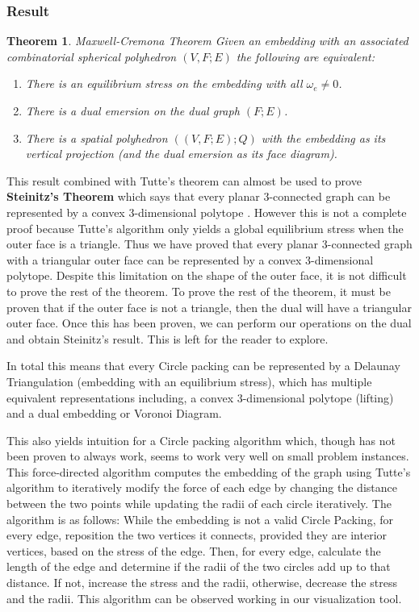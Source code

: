 \documentclass[11pt]{article}
\newtheorem{theorem}{Theorem}[section]
\theoremstyle{definition}
\begin{document}
\subsubsection{Result}

	\begin{theorem}{Maxwell-Cremona Theorem}
		Given an embedding with an associated combinatorial spherical polyhedron $(V,F;E)$ the following are equivalent:
			\begin{enumerate}
				\item There is an equilibrium stress on the embedding with all $\omega_e \neq 0$.
				\item There is a dual emersion on the dual graph $(F;E)$.
				\item There is a spatial polyhedron $((V,F;E);Q)$ with the embedding as its vertical projection (and the dual emersion as its face diagram).
 			\end{enumerate}
 	\end{theorem}
	
	This result combined with Tutte's theorem can almost be used to prove \textbf{Steinitz's Theorem} which says that every planar 3-connected graph can be represented by a convex 3-dimensional polytope \cite{realizationSpaces}. 
	However this is not a complete proof because Tutte's algorithm only yields a global equilibrium stress when the outer face is a triangle. 
	Thus we have proved that every planar 3-connected graph with a triangular outer face can be represented by a convex 3-dimensional polytope. 
	Despite this limitation on the shape of the outer face, it is not difficult to prove the rest of the theorem. 
	To prove the rest of the theorem, it must be proven that if the outer face is not a triangle, then the dual will have a triangular outer face. 
	Once this has been proven, we can perform our operations on the dual and obtain Steinitz's result. 
	This is left for the reader to explore.
 
 	In total this means that every Circle packing can be represented by a Delaunay Triangulation (embedding with an equilibrium stress), which has multiple equivalent representations including, a convex 3-dimensional polytope (lifting) and a dual embedding or Voronoi Diagram. 

	This also yields intuition for a Circle packing algorithm which, though has not been proven to always work, seems to work very well on small problem instances. 
	This force-directed algorithm computes the embedding of the graph using Tutte's algorithm to iteratively modify the force of each edge by changing the distance between the two points while updating the radii of each circle iteratively. 
	The algorithm is as follows: 
	While the embedding is not a valid Circle Packing, for every edge, reposition the two vertices it connects, provided they are interior vertices, based on the stress of the edge. 
	Then, for every edge, calculate the length of the edge and determine if the radii of the two circles add up to that distance. 
	If not, increase the stress and the radii, otherwise, decrease the stress and the radii. 
	This algorithm can be observed working in our visualization tool.
 
\end{document}
